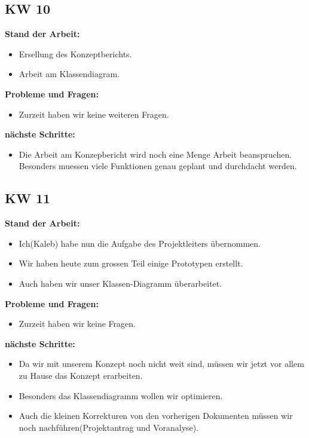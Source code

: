 \documentclass[10pt,paper=a4,final]{scrartcl}
\begin{document}
\subsection{KW 10}
\begin{description}
  \item {\bf Stand der Arbeit: } \\
    \begin{itemize}
      \item Ersellung des Konzeptberichts.
      \item Arbeit am Klassendiagram.
    \end{itemize}
  \item {\bf Probleme und Fragen: } \\
    \begin{itemize}
      \item Zurzeit haben wir keine weiteren Fragen.
    \end{itemize}
  \item {\bf nächste Schritte: } \\
    \begin{itemize}
      \item Die Arbeit am Konzepbericht wird noch eine Menge Arbeit beanspruchen. Besonders muessen viele Funktionen genau geplant und durchdacht werden.
    \end{itemize}
\end{description}
\subsection{KW 11}
\begin{description}
  \item {\bf Stand der Arbeit: } \\
    \begin{itemize}
      \item Ich(Kaleb) habe nun die Aufgabe des Projektleiters übernommen.
      \item Wir haben heute zum grossen Teil einige Prototypen erstellt.
      \item Auch haben wir unser Klassen-Diagramm überarbeitet.
    \end{itemize}
  \item {\bf Probleme und Fragen: } \\
    \begin{itemize}
      \item Zurzeit haben wir keine Fragen.
    \end{itemize}
  \item {\bf nächste Schritte: } \\
    \begin{itemize}
      \item Da wir mit unserem Konzept noch nicht weit sind, müssen wir jetzt vor allem zu Hause das Konzept erarbeiten.
      \item Besonders das Klassendiagramm wollen wir optimieren.
      \item Auch die kleinen Korrekturen von den vorherigen Dokumenten müssen wir noch nachführen(Projektantrag und Voranalyse).
    \end{itemize}
\end{description}
\end{document}
